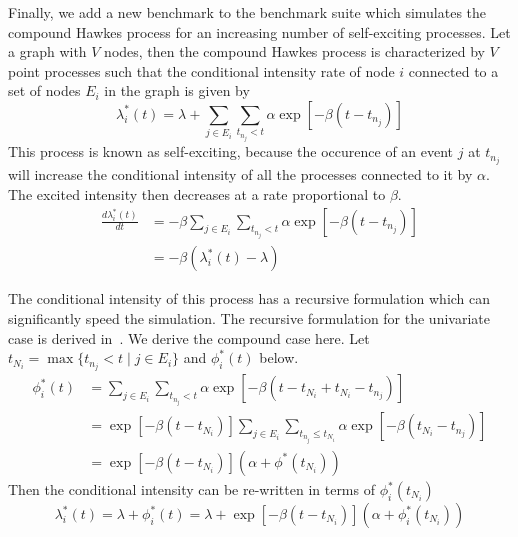 \documentclass{juliacon}
\begin{document}
Finally, we add a new benchmark to the benchmark suite which simulates the compound Hawkes process for an increasing number of self-exciting processes. Let a graph with \( V \) nodes, then the compound Hawkes process is characterized by \( V \) point processes such that the conditional intensity rate of node \( i \) connected to a set of nodes \( E_i \) in the graph is given by
\[
  \lambda_i^\ast (t) = \lambda + \sum_{j \in E_i} \sum_{t_{n_j} < t} \alpha \exp \left[-\beta (t - t_{n_j}) \right]
\]
This process is known as self-exciting, because the occurence of an event \( j \) at \( t_{n_j} \) will increase the conditional intensity of all the processes connected to it by \( \alpha \). The excited intensity then decreases at a rate proportional to \( \beta \).
\[
\begin{split}
  \frac{d \lambda_i^\ast (t)}{d t} 
    &= -\beta \sum_{j \in E_i} \sum_{t_{n_j} < t} \alpha \exp \left[-\beta (t - t_{n_j}) \right] \\
    &= -\beta \left( \lambda_i^\ast (t) - \lambda \right)
\end{split}
\]

The conditional intensity of this process has a recursive formulation which can significantly speed the simulation. The recursive formulation for the univariate case is derived in~\cite{laub2021}. We derive the compound case here. Let \( t_{N_i} = \max \{ t_{n_j} < t \mid j \in E_i \} \) and \( \phi_i^\ast (t) \) below.
\[
\begin{split}
  \phi_i^\ast (t) 
    &= \sum_{j \in E_i} \sum_{t_{n_j} < t} \alpha \exp \left[-\beta (t - t_{N_i} + t_{N_i} - t_{n_j}) \right] \\
    &= \exp \left[ -\beta (t - t_{N_i}) \right] \sum_{j \in E_i} \sum_{t_{n_j} \leq t_{N_i}} \alpha \exp \left[-\beta (t_{N_i} - t_{n_j}) \right] \\
    &= \exp \left[ -\beta (t - t_{N_i}) \right] \left( \alpha + \phi^\ast (t_{N_i}) \right)
\end{split}
\]
Then the conditional intensity can be re-written in terms of \( \phi_i^\ast (t_{N_i}) \)
\[
  \lambda_i^\ast (t) = \lambda + \phi_i^\ast (t) = \lambda + \exp \left[ -\beta (t - t_{N_i}) \right] \left( \alpha + \phi_i^\ast (t_{N_i}) \right)
\]
\end{document}
